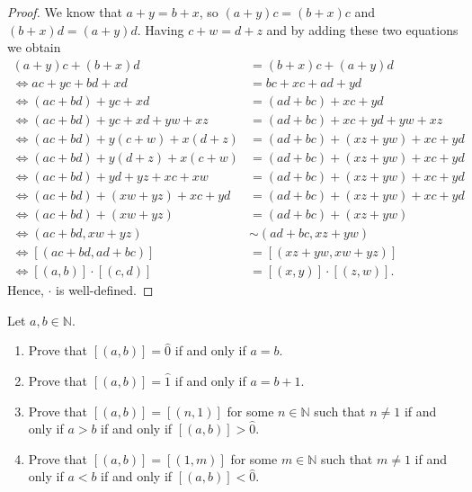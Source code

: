 \begin{proof}
	We know that $a + y = b + x$, so $(a + y)c = (b + x)c$ and $(b + x)d = (a + y)d$. Having $c + w = d + z$ and by adding these two equations we obtain
	\begin{align*}
		(a + y)c + (b + x)d                        & = (b + x)c + (a + y)d                   \\
		\iff a c + y c + b d + x d                 & = b c + x c + a d + y d                 \\
		\iff (a c + b d) + y c + x d               & = (a d + b c) + x c + y d               \\
		\iff (a c + b d) + y c + x d + y w + x z   & = (a d + b c) + x c + y d + y w + x z   \\
		\iff (a c + b d) + y(c + w) + x(d + z)     & = (a d + b c) + (x z + y w) + x c + y d \\
		\iff (a c + b d) + y(d + z) + x(c + w)     & = (a d + b c) + (x z + y w) + x c + y d \\
		\iff (a c + b d) + y d + y z + x c + x w   & = (a d + b c) + (x z + y w) + x c + y d \\
		\iff (a c + b d) + (x w + y z) + x c + y d & = (a d + b c) + (x z + y w) + x c + y d \\
		\iff (a c + b d) + (x w + y z)             & = (a d + b c) + (x z + y w)             \\
		\iff (a c + b d, x w + y z)                & \sim (a d + b c, x z + y w)             \\
		\iff [(a c + b d, a d + b c)]              & = [(x z + y w, x w + y z)]              \\
		\iff [(a, b)] \cdot [(c, d)]               & = [(x, y)] \cdot [(z, w)].
	\end{align*}
	Hence, $\cdot$ is well-defined.
\end{proof}


\Newpage
\begin{exercise} %
	\label{int:e:4}
	Let $a, b \in \mathbb{N}$.
	\begin{enumerate}
		\item \label{int:e:4:1}
		      Prove that $[(a, b)] = \hat{0}$ if and only if $a = b$.
		\item \label{int:e:4:2}
		      Prove that $[(a, b)] = \hat{1}$ if and only if $a = b + 1$.
		\item \label{int:e:4:3}
		      Prove that $[(a, b)] = [(n, 1)]$ for some $n \in \mathbb{N}$ such that
		      $n \neq 1$ if and only if $a > b$ if and only if $[(a, b)] > \hat{0}$.
		\item \label{int:e:4:4}
		      Prove that $[(a, b)] = [(1, m)]$ for some $m \in \mathbb{N}$ such that
		      $m \neq 1$ if and only if $a < b$ if and only if $[(a, b)] < \hat{0}$.
	\end{enumerate}
\end{exercise}

